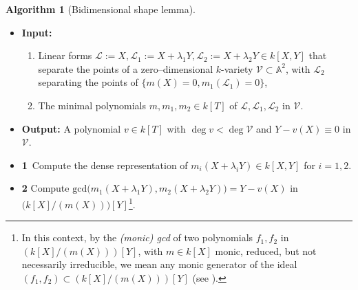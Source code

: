 \documentclass[pdflatex,sn-basic]{sn-jnl}%
\theoremstyle{thmstyleone}%
\theoremstyle{thmstyletwo}%
\theoremstyle{thmstylethree}%
\theoremstyle{definition}
\numberwithin{equation}{section}
\newtheorem{algorithm}[theorem]{Algorithm}
\newcommand{\A}{\mathbb A}
\begin{document}
\begin{algorithm}[Bidimensional shape lemma]
\label{algo: bidimensional shape lemma} ${}$
\begin{itemize}
\item[]{\bf Input:}
%
\begin{enumerate}
\item Linear forms $\mathcal{L}:=X,\mathcal{L}_1:=X+\lambda_1Y,
\mathcal{L}_2:=X+\lambda_2 Y\in k[X,Y]$ that separate the points of
a zero--dimensional $k$-variety $\mathcal{V}\subset\A^2$, with
$\mathcal{L}_2$ separating the points of
$\{m(X)=0,m_1(\mathcal{L}_1)=0\}$, \item The minimal polynomials
$m,m_1,m_2\in k[T]$ of $\mathcal{L},\mathcal{L}_1,\mathcal{L}_2$ in
$\mathcal{V}$.
\end{enumerate}

\item[]{\bf Output:} A polynomial $v\in k[T]$ with $\deg v<\deg\mathcal{V}$ and
  $Y-v(X)\equiv 0$ in $\mathcal{V}$.


\item[]{\bf 1}\ Compute the dense representation of
$m_i(X+\lambda_i Y)\in k[X,Y]$ for $i=1,2$.
%
\item[]{\bf 2} Compute $\mathrm{gcd}\big(m_1(X+\lambda_1
Y),m_2(X+\lambda_2
Y)\big)=Y-v(X)$ in $\big(k[X]/(m(X))\big)[Y]$\footnote{
In this context, by the \emph{(monic) gcd} of two polynomials $f_1,f_2$ in $(k[X]/(m(X)))[Y]$,
with $m\in k[X]$ monic, reduced, but not necessarily irreducible, we mean any monic generator of the ideal
$(f_1,f_2)\subset (k[X]/(m(X)))[Y]$ (see \cite{MoRi95}).
%
%
}.
%
\end{itemize}
\end{algorithm}
\end{document}

